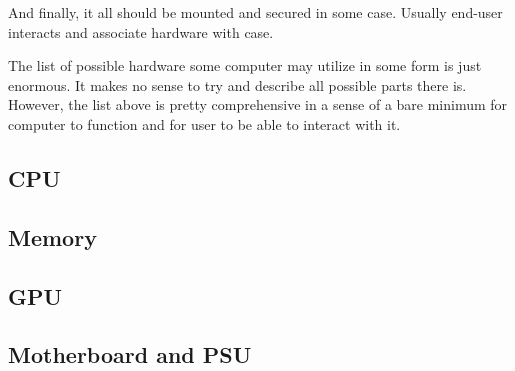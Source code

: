 \documentclass{report}
\begin{document}
            And finally, it all should be mounted and secured in some case. Usually end-user interacts and associate hardware with case. \par

            The list of possible hardware some computer may utilize in some form is just enormous. It makes no sense to try and describe all possible parts there is.
            However, the list above is pretty comprehensive in a sense of a bare minimum for computer to function and for user to be able to interact with it. \par
            

            \subsection{CPU}
            
            \subsection{Memory}
            \subsection{GPU}
            \subsection{Motherboard and PSU}
    
\end{document}
